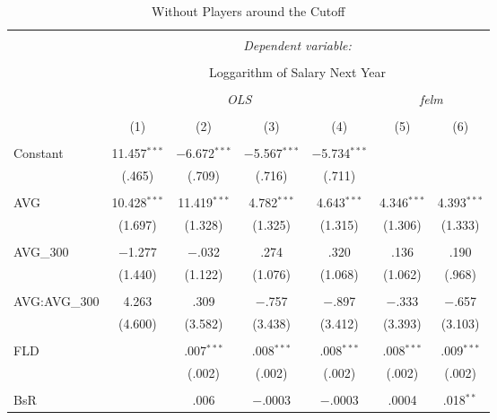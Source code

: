 
\begin{table}[H] \centering
  \caption{Without Players around the Cutoff}
  \label{AVG300_E}
\fontsize{5pt}{4pt}\selectfont
\begin{tabular}{@{\extracolsep{-15pt}}lcccccc}
\\[-1.8ex]\hline
\hline \\[-1.8ex]
 & \multicolumn{6}{c}{\textit{Dependent variable:}} \\
\cline{2-7}
\\[-1.8ex] & \multicolumn{6}{c}{Loggarithm of Salary Next Year} \\
\\[-1.8ex] & \multicolumn{4}{c}{\textit{OLS}} & \multicolumn{2}{c}{\textit{felm}} \\
\\[-1.8ex] & (1) & (2) & (3) & (4) & (5) & (6)\\
\hline \\[-1.8ex]
 Constant & 11.457$^{***}$ & $-$6.672$^{***}$ & $-$5.567$^{***}$ & $-$5.734$^{***}$ &  &  \\
  & (.465) & (.709) & (.716) & (.711) &  &  \\
  & & & & & & \\
 AVG & 10.428$^{***}$ & 11.419$^{***}$ & 4.782$^{***}$ & 4.643$^{***}$ & 4.346$^{***}$ & 4.393$^{***}$ \\
  & (1.697) & (1.328) & (1.325) & (1.315) & (1.306) & (1.333) \\
  & & & & & & \\
 AVG\_300 & $-$1.277 & $-$.032 & .274 & .320 & .136 & .190 \\
  & (1.440) & (1.122) & (1.076) & (1.068) & (1.062) & (.968) \\
  & & & & & & \\
  AVG:AVG\_300 & 4.263 & .309 & $-$.757 & $-$.897 & $-$.333 & $-$.657 \\
  & (4.600) & (3.582) & (3.438) & (3.412) & (3.393) & (3.103) \\
  & & & & & & \\
 FLD &  & .007$^{***}$ & .008$^{***}$ & .008$^{***}$ & .008$^{***}$ & .009$^{***}$ \\
  &  & (.002) & (.002) & (.002) & (.002) & (.002) \\
  & & & & & & \\
 BsR &  & .006 & $-$.0003 & $-$.0003 & .0004 & .018$^{**}$ \\

\end{tabular}
\end{table}
